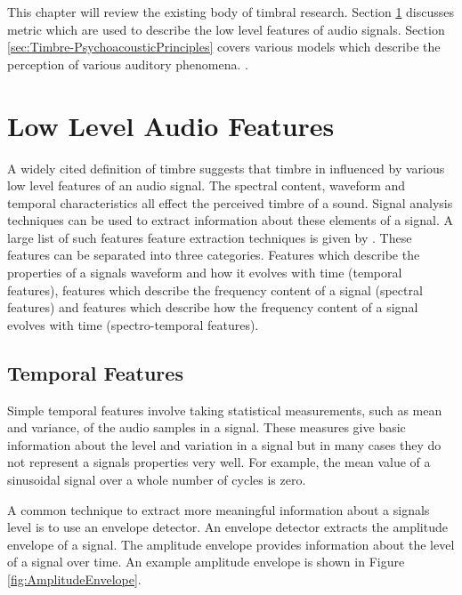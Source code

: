 	This chapter will review the existing body of timbral research. Section \ref{sec:Timbre-LowLevelFeatures} discusses
	metric which are used to describe the low level features of audio signals. Section
	\ref{sec:Timbre-PsychoacousticPrinciples} covers various models which describe the perception of various auditory
	phenomena. .

\section{Low Level Audio Features}
\label{sec:Timbre-LowLevelFeatures}
	A widely cited definition of timbre \citep{ASA1960american} suggests that timbre in influenced by various low level
	features of an audio signal. The spectral content, waveform and temporal characteristics all effect the perceived
	timbre of a sound. Signal analysis techniques can be used to extract information about these elements of a signal.
	A large list of such features feature extraction techniques is given by \citep{peeters2004a}. These features can be
	separated into three categories. Features which describe the properties of a signals waveform and how it evolves
	with time (temporal features), features which describe the frequency content of a signal (spectral features) and
	features which describe how the frequency content of a signal evolves with time (spectro-temporal features). 

	\subsection{Temporal Features}
	\label{sec:Timbre-LowLevelFeatures-Temporal}
		Simple temporal features involve taking statistical measurements, such as mean and variance, of the audio
		samples in a signal. These measures give basic information about the level and variation in a signal but in
		many cases they do not represent a signals properties very well. For example, the mean value of a sinusoidal
		signal over a whole number of cycles is zero. 

		A common technique to extract more meaningful information about a signals level is to use an envelope
		detector. An envelope detector extracts the amplitude envelope of a signal. The amplitude envelope provides
		information about the level of a signal over time. An example amplitude envelope is shown in Figure
		\ref{fig:AmplitudeEnvelope}.

